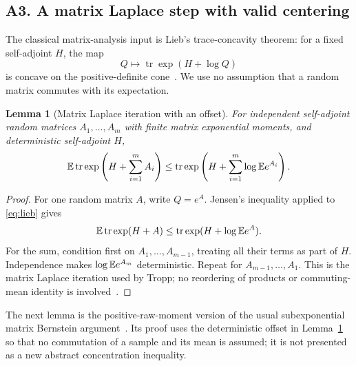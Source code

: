\documentclass[11pt]{article}
\numberwithin{equation}{section}
\newtheorem{lemma}[theorem]{Lemma}
\theoremstyle{definition}\newtheorem{definition}[theorem]{Definition}
\theoremstyle{remark}\newtheorem{remark}[theorem]{Remark}
\newcommand{\tr}{\operatorname{tr}}\newcommand{\Ent}{\operatorname{Ent}}
\begin{document}
\subsection{A3. A matrix Laplace step with valid centering}\label{sec:A-laplace}
The classical matrix-analysis input is Lieb's trace-concavity theorem: for a fixed
self-adjoint $H$, the map
\begin{equation}\label{eq:lieb}
 Q\longmapsto\tr\exp(H+\log Q)
\end{equation}
is concave on the positive-definite cone~\cite{Lieb,Tropp}.
We use no assumption that a random matrix commutes with its expectation.

\begin{lemma}[Matrix Laplace iteration with an offset]\label{lem:laplace}
For independent self-adjoint random matrices $A_1,\ldots,A_m$ with finite matrix
exponential moments, and deterministic self-adjoint $H$,
\begin{equation}\label{eq:laplace}
 \E\tr\exp\left(H+\sum_{i=1}^mA_i\right)
 \le\tr\exp\left(H+\sum_{i=1}^m\log\E e^{A_i}\right).
\end{equation}
\end{lemma}
\begin{proof}
For one random matrix $A$, write $Q=e^A$. Jensen's inequality applied to
\eqref{eq:lieb} gives
\[
 \E\tr\exp(H+A)\le\tr\exp(H+\log\E e^A).
\]
For the sum, condition first on $A_1,\ldots,A_{m-1}$, treating all their terms as
part of $H$. Independence makes $\log\mathbb E e^{A_m}$ deterministic. Repeat for
$A_{m-1},\ldots,A_1$. This is the matrix Laplace iteration used by Tropp;
no reordering of products or commuting-mean identity is involved~\cite{Tropp}.
\end{proof}

The next lemma is the positive-raw-moment version of the usual subexponential
matrix Bernstein argument~\cite[Theorem~6.2 and Lemma~6.8]{Tropp}.
Its proof uses the deterministic offset in Lemma~\ref{lem:laplace} so that no
commutation of a sample and its mean is assumed; it is not presented as a new
abstract concentration inequality.
\end{document}
